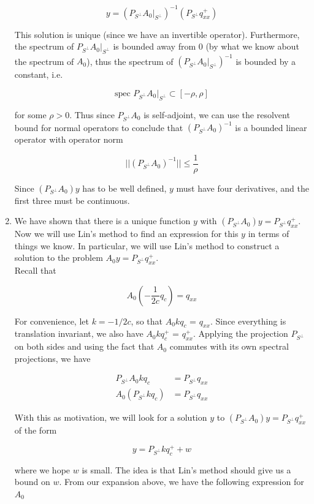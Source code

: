 \documentclass[12pt]{article}
\begin{document}
\begin{enumerate}
\[
y = (P_{S^\perp} A_0 |_{S^\perp})^{-1} (P_{S^\perp} q^+_{xx})
\]

This solution is unique (since we have an invertible operator). Furthermore, the spectrum of $P_{S^\perp} A_0 |_{S^\perp}$ is bounded away from 0 (by what we know about the spectrum of $A_0$), thus the spectrum of $(P_{S^\perp} A_0 |_{S^\perp})^{-1}$ is bounded by a constant, i.e. 

\[
\text{spec } P_{S^\perp} A_0 |_{S^\perp}  \subset [-\rho, \rho]
\]

for some $\rho > 0$. Thus since $P_{S^\perp} A_0$ is self-adjoint, we can use the resolvent bound for normal operators to conclude that $(P_{S^\perp} A_0)^{-1}$ is a bounded linear operator with operator norm

\[
|| (P_{S^\perp} A_0)^{-1} || \leq \frac{1}{\rho}
\]

Since $(P_{S^\perp} A_0) y$ has to be well defined, $y$ must have four derivatives, and the first three must be continuous.

\item We have shown that there is a unique function $y$ with $(P_{S^\perp} A_0) y = P_{S^\perp} q^+_{xx}$. Now we will use Lin's method to find an expression for this $y$ in terms of things we know. In particular, we will use Lin's method to construct a solution to the problem $A_0 y = P_{S^\perp} q^+_{xx}$.\\

Recall that

\begin{equation*}
A_0 \left( -\frac{1}{2c} q_c \right) = q_{xx}
\end{equation*}

For convenience, let $k = -1/2c$, so that $A_0 k q_c$ = $q_{xx}$. Since everything is translation invariant, we also have $A_0 k q^+_c$ = $q^+_{xx}$. Applying the projection $P_{S^\perp}$ on both sides and using the fact that $A_0$ commutes with its own spectral projections, we have

\begin{align*}
P_{S^\perp} A_0 k q_c &= P_{S^\perp} q_{xx} \\
A_0 (P_{S^\perp} k q_c) &= P_{S^\perp} q_{xx}
\end{align*}

With this as motivation, we will look for a solution $y$ to $(P_{S^\perp} A_0) y = P_{S^\perp} q^+_{xx}$ of the form

\[
y = P_{S^\perp} k q^+_c + w
\]

where we hope $w$ is small. The idea is that Lin's method should give us a bound on $w$. From our expansion above, we have the following expression for $A_0$


\end{enumerate}
\end{document}
